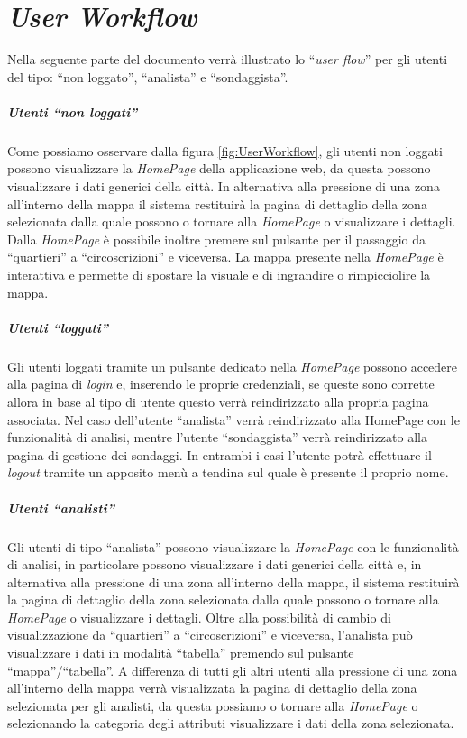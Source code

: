 \chapter{\textit{User Workflow}}
Nella seguente parte del documento verrà illustrato lo ``\textit{user flow}'' per gli utenti del tipo: ``non loggato'', ``analista'' e ``sondaggista''.
\paragraph{Utenti ``non loggati''} Come possiamo osservare dalla figura \ref{fig:UserWorkflow}, gli utenti non loggati possono visualizzare la \textit{HomePage} della applicazione web, da questa possono visualizzare i dati generici della città. In alternativa alla pressione di una zona all'interno della mappa il sistema restituirà la pagina di dettaglio della zona selezionata dalla quale possono o tornare alla \textit{HomePage} o visualizzare i dettagli. Dalla \textit{HomePage} è possibile inoltre premere sul pulsante per il passaggio da ``quartieri'' a ``circoscrizioni'' e viceversa. La mappa presente nella \textit{HomePage} è interattiva e permette di spostare la visuale e di ingrandire o rimpicciolire la mappa.
\paragraph{Utenti ``loggati''} Gli utenti loggati tramite un pulsante dedicato nella \textit{HomePage} possono accedere alla pagina di \textit{login} e, inserendo le proprie credenziali, se queste sono corrette allora in base al tipo di utente questo verrà reindirizzato alla propria pagina associata. Nel caso dell'utente ``analista'' verrà reindirizzato alla HomePage con le funzionalità di analisi, mentre l'utente ``sondaggista'' verrà reindirizzato alla pagina di gestione dei sondaggi. In entrambi i casi l'utente potrà effettuare il \textit{logout} tramite un apposito menù a tendina sul quale è presente il proprio nome.
\paragraph{Utenti ``analisti''} Gli utenti di tipo ``analista'' possono visualizzare la \textit{HomePage} con le funzionalità di analisi, in particolare possono visualizzare i dati generici della città e, in alternativa alla pressione di una zona all'interno della mappa, il sistema restituirà la pagina di dettaglio della zona selezionata dalla quale possono o tornare alla \textit{HomePage} o visualizzare i dettagli. Oltre alla possibilità di cambio di visualizzazione da ``quartieri'' a ``circoscrizioni'' e viceversa, l'analista può visualizzare i dati in modalità ``tabella'' premendo sul pulsante ``mappa''/``tabella''. A differenza di tutti gli altri utenti alla pressione di una zona all'interno della mappa verrà visualizzata la pagina di dettaglio della zona selezionata per gli analisti, da questa possiamo o tornare alla \textit{HomePage} o selezionando la categoria degli attributi visualizzare i dati della zona selezionata.
